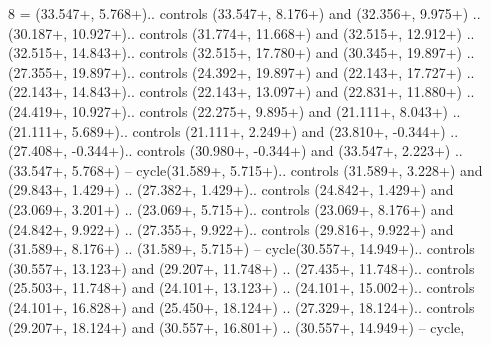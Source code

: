 {8} = {(33.547+\ctpXshift, 5.768+\ctpYshift).. controls (33.547+\ctpXshift, 8.176+\ctpYshift) and (32.356+\ctpXshift, 9.975+\ctpYshift) .. (30.187+\ctpXshift, 10.927+\ctpYshift).. controls (31.774+\ctpXshift, 11.668+\ctpYshift) and (32.515+\ctpXshift, 12.912+\ctpYshift) .. (32.515+\ctpXshift, 14.843+\ctpYshift).. controls (32.515+\ctpXshift, 17.780+\ctpYshift) and (30.345+\ctpXshift, 19.897+\ctpYshift) .. (27.355+\ctpXshift, 19.897+\ctpYshift).. controls (24.392+\ctpXshift, 19.897+\ctpYshift) and (22.143+\ctpXshift, 17.727+\ctpYshift) .. (22.143+\ctpXshift, 14.843+\ctpYshift).. controls (22.143+\ctpXshift, 13.097+\ctpYshift) and (22.831+\ctpXshift, 11.880+\ctpYshift) .. (24.419+\ctpXshift, 10.927+\ctpYshift).. controls (22.275+\ctpXshift, 9.895+\ctpYshift) and (21.111+\ctpXshift, 8.043+\ctpYshift) .. (21.111+\ctpXshift, 5.689+\ctpYshift).. controls (21.111+\ctpXshift, 2.249+\ctpYshift) and (23.810+\ctpXshift, -0.344+\ctpYshift) .. (27.408+\ctpXshift, -0.344+\ctpYshift).. controls (30.980+\ctpXshift, -0.344+\ctpYshift) and (33.547+\ctpXshift, 2.223+\ctpYshift) .. (33.547+\ctpXshift, 5.768+\ctpYshift) -- cycle(31.589+\ctpXshift, 5.715+\ctpYshift).. controls (31.589+\ctpXshift, 3.228+\ctpYshift) and (29.843+\ctpXshift, 1.429+\ctpYshift) .. (27.382+\ctpXshift, 1.429+\ctpYshift).. controls (24.842+\ctpXshift, 1.429+\ctpYshift) and (23.069+\ctpXshift, 3.201+\ctpYshift) .. (23.069+\ctpXshift, 5.715+\ctpYshift).. controls (23.069+\ctpXshift, 8.176+\ctpYshift) and (24.842+\ctpXshift, 9.922+\ctpYshift) .. (27.355+\ctpXshift, 9.922+\ctpYshift).. controls (29.816+\ctpXshift, 9.922+\ctpYshift) and (31.589+\ctpXshift, 8.176+\ctpYshift) .. (31.589+\ctpXshift, 5.715+\ctpYshift) -- cycle(30.557+\ctpXshift, 14.949+\ctpYshift).. controls (30.557+\ctpXshift, 13.123+\ctpYshift) and (29.207+\ctpXshift, 11.748+\ctpYshift) .. (27.435+\ctpXshift, 11.748+\ctpYshift).. controls (25.503+\ctpXshift, 11.748+\ctpYshift) and (24.101+\ctpXshift, 13.123+\ctpYshift) .. (24.101+\ctpXshift, 15.002+\ctpYshift).. controls (24.101+\ctpXshift, 16.828+\ctpYshift) and (25.450+\ctpXshift, 18.124+\ctpYshift) .. (27.329+\ctpXshift, 18.124+\ctpYshift).. controls (29.207+\ctpXshift, 18.124+\ctpYshift) and (30.557+\ctpXshift, 16.801+\ctpYshift) .. (30.557+\ctpXshift, 14.949+\ctpYshift) -- cycle},
